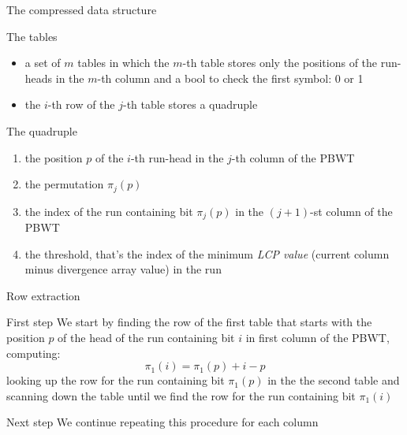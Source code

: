 \documentclass{beamer}
\begin{document}
\begin{frame}{The compressed data structure}
  \begin{block}{The tables}
    \begin{itemize}
      \item a set of $m$ tables in which the $m$-th table stores only the
      positions of the run-heads in the $m$-th column and a bool to check the
      first symbol: 0 or 1
      \item the $i$-th row of the $j$-th table stores a quadruple
    \end{itemize}    
  \end{block}
  \pause
  \begin{block}{The quadruple}
    \begin{enumerate}
      \item the position $p$ of the $i$-th run-head in the $j$-th column of the
      PBWT 
      \item the permutation $\pi_j(p)$
      \item the index of the run containing bit $\pi_j(p)$ in the $(j + 1)$-st
      column of the PBWT
      \item the threshold, that's the index of the minimum \textit{LCP value}
      (current column minus divergence array value) in the run
    \end{enumerate}
  \end{block}
\end{frame}
\begin{frame}{Row extraction}
  \begin{block}{First step}
    We start by finding the row of the first table that starts with the position
    $p$ of the head of the run containing bit $i$ in first column of the PBWT,
    computing: 
    \pause
    \[\pi_1(i)=\pi_1(p)+i-p\]
    \pause
    looking up the row for the run containing bit $\pi_1(p)$ in the the second
    table and scanning down the table until we find the row for the run
    containing bit $\pi_1(i)$ 
  \end{block}
  \begin{block}{Next step}
    We continue repeating this procedure for each column
  \end{block}
\end{frame}
\end{document}
